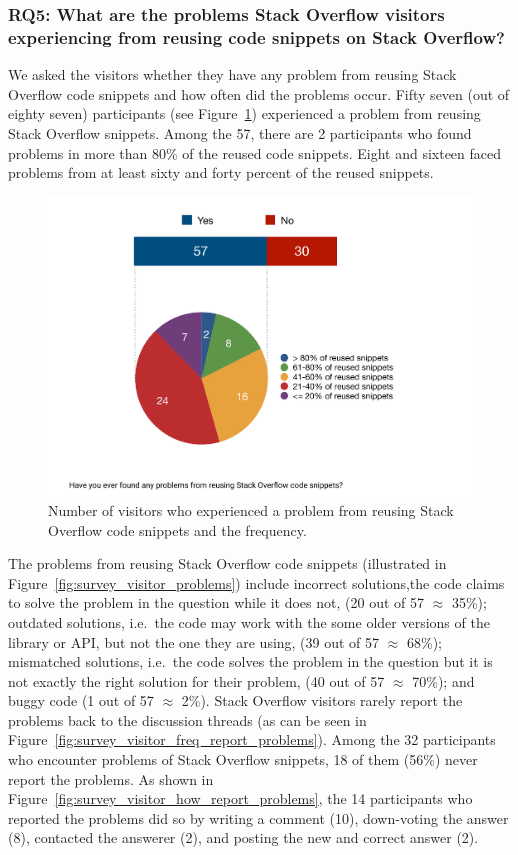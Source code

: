 \documentclass{svjour3}                     %
\begin{document}
\subsubsection*{RQ5: What are the problems Stack Overflow visitors experiencing
	from reusing code snippets on Stack Overflow?}

We asked the visitors whether they have any problem from reusing Stack Overflow
code snippets and how often did the problems occur.  Fifty seven (out of eighty
seven) participants (see Figure~\ref{fig:survey_v_problems}) experienced a
problem from reusing Stack Overflow snippets. Among the 57, there are 2
participants who found problems in more than 80\% of the reused code snippets.
Eight and sixteen faced problems from at least sixty and forty percent of the
reused snippets.


\begin{figure} \centering
	\includegraphics[width=.4\linewidth]{survey_v_problems} 
	\caption{Number of visitors who experienced a problem from reusing Stack Overflow code snippets and the frequency.}
	\label{fig:survey_v_problems} 
\end{figure}

The problems from reusing Stack Overflow code snippets (illustrated in
Figure~\ref{fig:survey_visitor_problems}) include incorrect solutions,the code
claims to solve the problem in the question while it does not,  (20 out of 57
$\approx$ 35\%); outdated solutions, i.e.~the code may work with the some older
versions of the library or API, but not the one they are using, (39 out of 57
$\approx$ 68\%); mismatched solutions, i.e.~the code solves the problem in the
question but it is not exactly the right solution for their problem, (40 out of
57 $\approx$ 70\%); and buggy code (1 out of 57 $\approx$ 2\%). Stack Overflow
visitors rarely report the problems back to the discussion threads (as can be
seen in Figure~\ref{fig:survey_visitor_freq_report_problems}). Among the 32
participants who encounter problems of Stack Overflow snippets, 18 of them
(56\%) never report the problems. As shown in
Figure~\ref{fig:survey_visitor_how_report_problems}, the 14 participants who
reported the problems did so by writing a comment (10), down-voting the answer
(8), contacted the answerer (2), and posting the new and correct answer (2).
\end{document}
